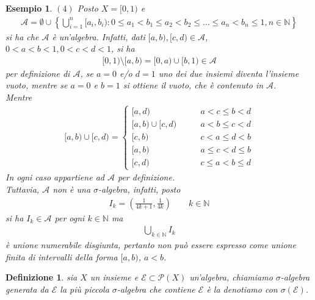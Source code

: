 \documentclass[oneside, 11pt]{amsbook}
\newcommand{\0}{{(0)}}
\newcommand{\3}{{(3)}}
\theoremstyle{colonplain}
\theoremstyle{colondefinition}
\newtheorem{defn}[thm]{Definizione}
\newtheorem{ex}[thm]{Esempio}
\theoremstyle{colonremark}
\numberwithin{equation}{chapter}
\begin{document}
\begin{ex}
$(4)$ Posto $X = [0, 1)$ e
\begin{align}
    \mathcal{A} = \emptyset \cup \left\{\bigcup_{i = 1}^n [a_i, b_i) : 0 \leq a_1 < b_1 \leq a_2 < b_2 \leq \dots \leq a_n < b_n \leq 1, n \in \mathbb{N}\right\}
\end{align}
si ha che $\mathcal{A}$ è un'algebra. Infatti, dati $[a, b), [c, d) \in \mathcal{A}$, $0 < a < b < 1, 0 < c < d < 1$, si ha
\begin{align}
    [0, 1) \setminus [a, b) = [0, a) \cup [b, 1) \in \mathcal{A}
\end{align}
per definizione di $\mathcal{A}$, se $a = 0$ e/o $d = 1$ uno dei due insiemi diventa l'insieme vuoto, mentre se $a = 0$ e $b = 1$ si ottiene il vuoto, che è contenuto in $\mathcal{A}$. \\
Mentre
\begin{align}
    [a, b) \cup [c, d) = \begin{cases}
        [a, d) \qquad &a < c \leq b < d \\
        [a, b) \cup [c, d) \qquad &a < b \leq c < d \\
        [c, b) \qquad & c < a \leq d < b \\
        [a, b) \qquad &a \leq c < d \leq b \\
        [c, d) \qquad &c \leq a < b \leq d
    \end{cases}
\end{align}
In ogni caso appartiene ad $\mathcal{A}$ per definizione. \\
Tuttavia, $\mathcal{A}$ non è una $\sigma$-algebra, infatti, posto
\begin{align}
    I_k = \left(\frac{1}{4k + 1}, \frac{1}{4k}\right) \qquad k \in \mathbb{N}
\end{align}
si ha $I_k \in \mathcal{A}$ per ogni $k \in \mathbb{N}$ ma
\begin{align}
    \bigcup_{k \in \mathbb{N}} I_k
\end{align}
è unione numerabile disgiunta, pertanto non può essere espresso come unione finita di intervalli della forma $[a, b)$, $a < b$.
\end{ex}
\begin{defn}
sia $X$ un insieme e $\mathcal{E} \subset \mathcal{P}(X)$ un'algebra, chiamiamo $\sigma$-\textit{algebra generata da} $\mathcal{E}$ la più piccola $\sigma$-algebra che contiene $\mathcal{E}$ è la denotiamo con $\sigma(\mathcal{E})$.
\end{defn}
\end{document}
